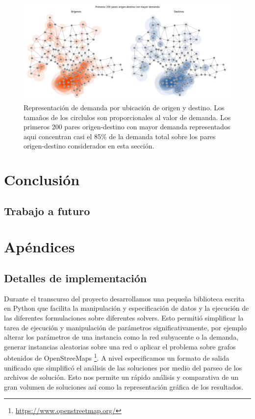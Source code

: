 \documentclass{article}
\begin{document}
  \begin{figure}[h!]
    \centering
    \includegraphics[width=12cm]{../resources/montevideo_demands.png}
      \caption{Representación de demanda por ubicación de origen y destino. Los tamaños de los circlulos son proporcionales al valor de demanda. Los primeros 200 pares origen-destino con mayor demanda representados aqui concentran casi el 85\% de la demanda total sobre los pares origen-destino considerados en esta sección.}
    \label{fig:montevideodemanddist}
  \end{figure}


  \section{Conclusión}

  \subsection{Trabajo a futuro}

  \section{Apéndices}

  \subsection{Detalles de implementación}

  Durante el transcurso del proyecto desarrollamos una pequeña biblioteca escrita en Python que facilita la manipulación y especificación de datos y la ejecución de las diferentes formulaciones sobre diferentes solvers. Esto permitió simplificar la tarea de ejecución y manipulación de parámetros significativamente, por ejemplo alterar los parámetros de una instancia como la red subyacente o la demanda, generar instancias aleatorias sobre una red o aplicar el problema sobre grafos obtenidos de OpenStreeMaps \footnote{\url{https://www.openstreetmap.org/}}. A nivel especificamos un formato de salida unificado que simplificó el análisis de las soluciones por medio del parseo de los archivos de solución. Esto nos permite un rápido análisis y comparativa de un gran volumen de soluciones así como la representación gráfica de los resultados.
\end{document}
